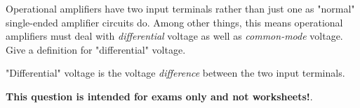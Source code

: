 

Operational amplifiers have two input terminals rather than just one as "normal" single-ended amplifier circuits do.  Among other things, this means operational amplifiers must deal with {\it differential} voltage as well as {\it common-mode} voltage.  Give a definition for "differential" voltage.







"Differential" voltage is the voltage {\it difference} between the two input terminals.







{\bf This question is intended for exams only and not worksheets!}.





